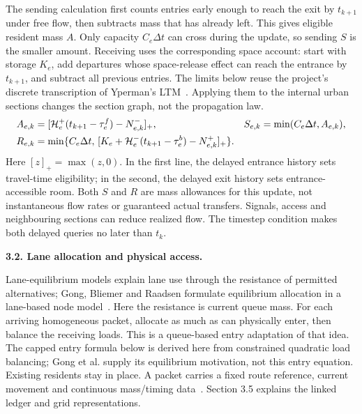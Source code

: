 \documentclass[10pt,a4paper]{article}
\newcommand{\pos}[1]{[#1]_+}
\newcommand{\rev}[1]{{\color{revisionred}#1}}
\begin{document}
The sending calculation first counts entries early enough to reach the
exit by $t_{k+1}$ under free flow, then subtracts mass that has already
left. This gives eligible resident mass $A$. Only capacity $C_e\Delta t$
can cross during the update, so sending $S$ is the smaller amount.
Receiving uses the corresponding space account: start with storage
$K_e$, add departures whose space-release effect can reach the entrance
by $t_{k+1}$, and subtract all previous entries.
\rev{The limits below reuse the project's discrete transcription of Yperman's LTM~\cite{m0}.}
Applying them to the internal urban sections changes the section graph,
not the propagation law.
\begin{align}
 A_{e,k}&=\pos{{\cal H}^+_e(t_{k+1}-\tau^f_e)-N^-_{e,k}},
 &S_{e,k}&=\min(C_e\Delta t,A_{e,k}),\label{eq:compact-sending}\\
 R_{e,k}&=\min\{C_e\Delta t,\,
 \pos{K_e+{\cal H}^-_e(t_{k+1}-\tau^b_e)-N^+_{e,k}}\}.
 \label{eq:compact-receiving}
\end{align}
Here $[z]_+=\max(z,0)$. In the first line, the delayed entrance history
sets travel-time eligibility; in the second, the delayed exit history
sets entrance-accessible room. Both $S$ and $R$ are mass allowances for
this update, not instantaneous flow rates or guaranteed actual transfers.
Signals, access and neighbouring sections can reduce realized flow.
The timestep condition makes both delayed queries no later than $t_k$.

\textbf{3.2. Lane allocation and physical access.}

Lane-equilibrium models explain lane use through the resistance of
permitted alternatives; Gong, Bliemer and Raadsen formulate equilibrium
allocation in a lane-based node model~\cite{gong}. Here the resistance is
current queue mass. For each arriving homogeneous packet, allocate as much
as can physically enter, then balance the receiving loads. This is a
queue-based entry adaptation of that idea.
\rev{The capped entry formula below is derived here from constrained quadratic load balancing; Gong et al. supply its equilibrium motivation, not this entry equation.} Existing residents stay in place. A packet carries a fixed
route reference, current movement and continuous mass/timing data~\cite{m1}.
Section 3.5 explains the linked ledger and grid representations.
\par
\end{document}
